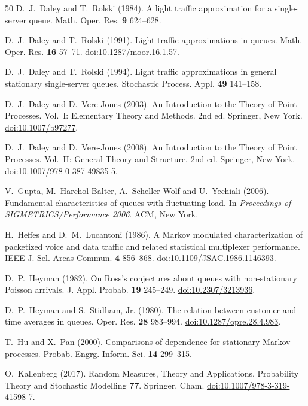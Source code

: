 \documentclass[11pt,reqno]{amsart}
\numberwithin{equation}{section}
\theoremstyle{plain}
\theoremstyle{definition}
\newcommand{\1}{\mathbf 1}
\begin{document}
\begin{thebibliography}{50}
D.~J.~Daley and T.~Rolski (1984).
A light traffic approximation for a single-server queue.
Math. Oper. Res. \textbf{9} 624--628.

D.~J.~Daley and T.~Rolski (1991).
Light traffic approximations in queues.
Math. Oper. Res. \textbf{16} 57--71.
\href{https://doi.org/10.1287/moor.16.1.57}{doi:10.1287/moor.16.1.57}.

D.~J.~Daley and T.~Rolski (1994).
Light traffic approximations in general stationary single-server queues.
Stochastic Process. Appl. \textbf{49} 141--158.

D.~J.~Daley and D.~Vere-Jones (2003).
An Introduction to the Theory of Point Processes. Vol.~I: Elementary Theory and Methods.
2nd ed. Springer, New York.
\href{https://doi.org/10.1007/b97277}{doi:10.1007/b97277}.

D.~J.~Daley and D.~Vere-Jones (2008).
An Introduction to the Theory of Point Processes. Vol.~II: General Theory and Structure.
2nd ed. Springer, New York.
\href{https://doi.org/10.1007/978-0-387-49835-5}{doi:10.1007/978-0-387-49835-5}.

V.~Gupta, M.~Harchol-Balter, A.~Scheller-Wolf and U.~Yechiali (2006).
Fundamental characteristics of queues with fluctuating load.
In \emph{Proceedings of SIGMETRICS/Performance 2006}. ACM, New York.

H.~Heffes and D.~M.~Lucantoni (1986).
A Markov modulated characterization of packetized voice and data traffic and related statistical multiplexer performance.
IEEE J. Sel. Areas Commun. \textbf{4} 856--868.
\href{https://doi.org/10.1109/JSAC.1986.1146393}{doi:10.1109/JSAC.1986.1146393}.

D.~P.~Heyman (1982).
On Ross's conjectures about queues with non-stationary Poisson arrivals.
J. Appl. Probab. \textbf{19} 245--249.
\href{https://doi.org/10.2307/3213936}{doi:10.2307/3213936}.

D.~P.~Heyman and S.~Stidham, Jr. (1980).
The relation between customer and time averages in queues.
Oper. Res. \textbf{28} 983--994.
\href{https://doi.org/10.1287/opre.28.4.983}{doi:10.1287/opre.28.4.983}.

T.~Hu and X.~Pan (2000).
Comparisons of dependence for stationary Markov processes.
Probab. Engrg. Inform. Sci. \textbf{14} 299--315.

O.~Kallenberg (2017).
Random Measures, Theory and Applications.
Probability Theory and Stochastic Modelling \textbf{77}. Springer, Cham.
\href{https://doi.org/10.1007/978-3-319-41598-7}{doi:10.1007/978-3-319-41598-7}.


\end{thebibliography}
\end{document}
